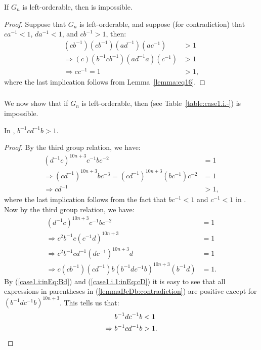 \begin{proposition} If $G_n$ is left-orderable, then  is impossible.
\end{proposition}
\begin{proof} Suppose that $G_n$ is left-orderable, and suppose (for contradiction) that $ca^{-1}<1$, $da^{-1}<1$, and $cb^{-1}>1$, then: 
\begin{align*}
(cb^{-1})(cb^{-1})(ad^{-1})(ac^{-1})&>1\\
\Rightarrow{}(c)(b^{-1}cb^{-1})(ad^{-1}a)(c^{-1})&>1\\
\Rightarrow{}cc^{-1}=1&>1,
\end{align*}
where the last implication follows from Lemma~\ref{lemma:eq16}.
\end{proof}


\subsubsection{\protect{}}

\noindent{}We now show that if $G_n$ is left-orderable, then  (see Table~\ref{table:case1.i.-}) is impossible.

\begin{lemma} In , $b^{-1}cd^{-1}b>1$.\label{case1.i.1:inEq:BcDb}
\end{lemma}
\begin{proof} By the third group relation, we have:
\begin{align}
(d^{-1}c)^{10n+3}c^{-1}bc^{-2}&=1\nonumber{}\\
\Rightarrow{}(cd^{-1})^{10n+3}bc^{-3}=(cd^{-1})^{10n+3}(bc^{-1})c^{-2}&=1\nonumber{}\\
\Rightarrow{}cd^{-1}&>1,\label{case1.i.1:inEq:cD}
\end{align}
where the last implication follows from the fact that $bc^{-1}<1$ and $c^{-1}<1$ in . Now by the third group relation, we have:
\begin{align}
(d^{-1}c)^{10n+3}c^{-1}bc^{-2}&=1\nonumber{}\\
\Rightarrow{}c^{2}b^{-1}c(c^{-1}d)^{10n+3}&=1\nonumber{}\\
\Rightarrow{}c^{2}b^{-1}cd^{-1}(dc^{-1})^{10n+3}d&=1\nonumber{}\\
\Rightarrow{}c(cb^{-1})(cd^{-1})b(b^{-1}dc^{-1}b)^{10n+3}(b^{-1}d)&=1.\label{lemmaBcDb:contradiction}
\end{align}
By (\ref{case1.i:inEq:Bd}) and (\ref{case1.i.1:inEq:cD}) it is easy to see that all expressions in parentheses in (\ref{lemmaBcDb:contradiction}) are positive except for $(b^{-1}dc^{-1}b)^{10n+3}$. This tells us that:
\begin{align*}
b^{-1}dc^{-1}b&<1\\
\Rightarrow{}b^{-1}cd^{-1}b&>1.\qedhere
\end{align*}
\end{proof}

